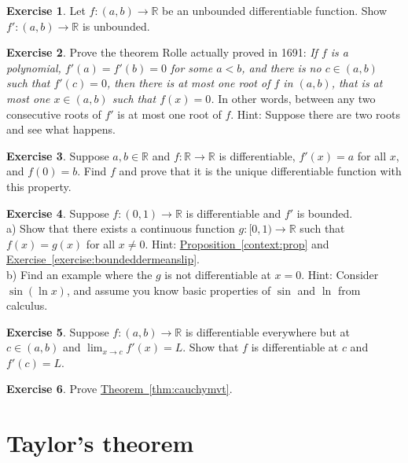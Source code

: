 \documentclass[12pt]{book}
\newcommand{\R}{{\mathbb{R}}}
\newcommand{\sectionnewpage}{\clearpage}
\theoremstyle{plain}
\theoremstyle{remark}
\theoremstyle{definition}
\theoremstyle{exercise}
\newtheorem{exercise}{Exercise}[section]
\theoremstyle{example}
\newcommand{\exerciseref}[1]{\hyperref[#1]{Exercise~\ref*{#1}}}
\newcommand{\thmref}[1]{\hyperref[#1]{Theorem~\ref*{#1}}}
\newcommand{\propref}[1]{\hyperref[#1]{Proposition~\ref*{#1}}}
\begin{document}
\begin{exercise}
Let $f \colon (a,b) \to \R$ be an unbounded differentiable function.  Show
$f' \colon (a,b) \to \R$ is unbounded.
\end{exercise}

\begin{exercise}
Prove the theorem Rolle actually proved in 1691:
\emph{If $f$ is a polynomial,
$f'(a) = f'(b) = 0$ for some $a < b$,
and there is no $c \in (a,b)$ such that $f'(c) = 0$,
then there is at most one root of $f$ in $(a,b)$,
that is at most one $x \in (a,b)$ such that $f(x) = 0$.}
In other words, between any two consecutive roots of $f'$ is at most one
root of $f$.
Hint: Suppose there are two roots and see what happens.
\end{exercise}

\begin{exercise}
Suppose $a,b \in \R$ and $f \colon \R \to \R$ is differentiable,
$f'(x) = a$ for all $x$, and $f(0) = b$.  Find $f$ and prove that 
it is the unique differentiable function with this property.
\end{exercise}

\begin{exercise} \label{exercise:extendboundedder}
Suppose $f \colon (0,1) \to \R$ is differentiable and $f'$
is bounded.\\
a) Show that there exists a continuous function $g \colon [0,1) \to \R$
such that $f(x) = g(x)$ for all $x \not= 0$.  Hint: \propref{context:prop} and
\exerciseref{exercise:boundeddermeanslip}.
\\
b) Find an example where the $g$ is not differentiable at $x=0$.
Hint: Consider $\sin(\ln x)$, and assume you know basic properties of
$\sin$ and $\ln$ from calculus.
\end{exercise}

\begin{exercise}
Suppose $f \colon (a,b) \to \R$ is differentiable everywhere but at $c \in
(a,b)$ and $\lim_{x \to c} f'(x) = L$.  Show that $f$ is differentiable at
$c$ and $f'(c) = L$.
\end{exercise}

\begin{exercise}
Prove \thmref{thm:cauchymvt}.
\end{exercise}


\sectionnewpage
\section{Taylor's theorem}
\label{sec:taylor}
\end{document}
